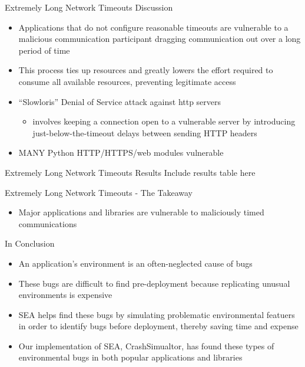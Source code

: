 \documentclass[pdf]{beamer}
\begin{document}
\begin{frame}{Extremely Long Network Timeouts Discussion}
  \begin{itemize}
  \item{Applications that do not configure reasonable timeouts are vulnerable
      to a malicious communication participant dragging communication out over a
      long period of time}
  \item{This process ties up resources and greatly lowers the effort required to
      consume all available resources, preventing legitimate access}
  \item{``Slowloris'' Denial of Service attack against http servers}
    \begin{itemize}
    \item{involves keeping a connection open to a vulnerable server by
        introducing just-below-the-timeout delays between sending HTTP headers}
        \end{itemize}
  \item{MANY Python HTTP/HTTPS/web modules vulnerable}
  \end{itemize}
\end{frame}


\begin{frame}{Extremely Long Network Timeouts Results}
  Include results table here
\end{frame}


\begin{frame}{Extremely Long Network Timeouts - The Takeaway}
  \begin{itemize}
    \item{Major applications and libraries are vulnerable to maliciously
      timed communications}
  \end{itemize}
\end{frame}


\begin{frame}{In Conclusion}
  \begin{itemize}
  \item{An application's environment is an often-neglected cause of bugs}
  \item{These bugs are difficult to find pre-deployment because replicating
      unusual environments is expensive}
  \item{SEA helps find these bugs by simulating problematic environmental
      featuers in order to identify bugs before deployment, thereby
      saving time and expense}
  \item{Our implementation of SEA, CrashSimualtor, has found these types
      of environmental bugs in both popular applications and libraries}
  \end{itemize}
\end{frame}
\end{document}
